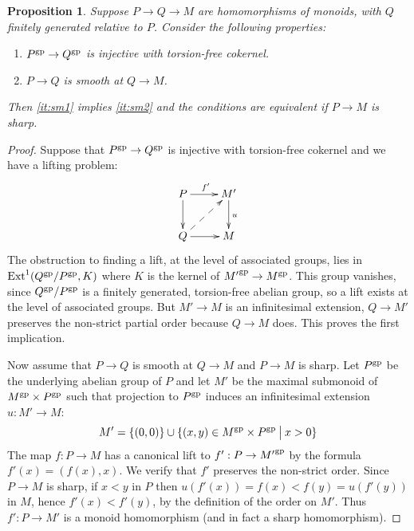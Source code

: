 \documentclass[12pt]{amsart}
\newtheorem{proposition}[theorem]{Proposition}
\theoremstyle{definition}
\theoremstyle{remark}
\def\Ext{\operatorname{Ext}}
\begin{document}
\begin{proposition} \label{prop:torsion-free}
Suppose $P \to Q \to M$ are homomorphisms of monoids, with $Q$ finitely generated relative to $P$.  Consider the following properties:
\begin{enumerate}[label=(\roman{*})]
\item \label{it:sm1} $P^{\rm gp} \to Q^{\rm gp}$ is injective with torsion-free cokernel.
\item \label{it:sm2} $P \to Q$ is smooth at $Q \to M$.
\end{enumerate}
Then \ref{it:sm1} implies \ref{it:sm2} and the conditions are equivalent if $P \to M$ is sharp.
\end{proposition}
\begin{proof}
Suppose that $P^{\rm gp} \to Q^{\rm gp}$ is injective with torsion-free cokernel and we have a lifting problem:
\begin{equation} \label{eqn:3} \vcenter{ \xymatrix{
P \ar[r]^{f'} \ar[d] & M' \ar[d]^u \\
Q \ar[r] \ar@{-->}[ur] & M
} } \end{equation} 
The obstruction to finding a lift, at the level of associated groups, lies in $\Ext^1(Q^{\rm gp}/P^{\rm gp}, K)$ where $K$ is the kernel of ${M'}^{\rm gp} \to M^{\rm gp}$.  This group vanishes, since $Q^{\rm gp} / P^{\rm gp}$ is a finitely generated, torsion-free abelian group, so a lift exists at the level of associated groups.  But $M' \to M$ is an infinitesimal extension, $Q \to M'$ preserves the non-strict partial order because $Q \to M$ does.  This proves the first implication.

Now assume that $P \to Q$ is smooth at $Q \to M$ and $P \to M$ is sharp.  Let $P^{\rm gp}$ be the underlying abelian group of $P$ and let $M'$ be the maximal submonoid of $M^{\rm gp} \times P^{\rm gp}$ such that projection to $P^{\rm gp}$ induces an infinitesimal extension $u: M' \to M$:
\begin{equation*}
M' = \{ (0,0) \} \cup \{ (x,y) \in M^{\rm gp} \times P^{\rm gp}  \: \big| \: x > 0 \}
\end{equation*}
The map $f : P \to M$ has a canonical lift to $f' : P \to {M'}^{\rm gp}$ by the formula $f'(x) = (f(x), x)$.  We verify that $f'$ preserves the non-strict order.  Since $P \to M$ is sharp, if $x < y$ in $P$ then $u(f'(x)) = f(x) < f(y) = u(f'(y))$ in $M$, hence $f'(x) < f'(y)$, by the definition of the order on $M'$.  Thus $f' : P \to M'$ is a monoid homomorphism (and in fact a sharp homomorphism).


\end{proof}
\end{document}
